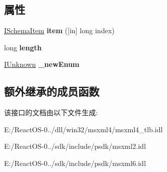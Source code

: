 \subsection*{属性}
\begin{DoxyCompactItemize}
\item 
\mbox{\label{interface_m_s_x_m_l2_1_1_i_schema_item_collection_a08dca69ffd3855a7cfbb4d5af7f3cdad}} 
\hyperlink{interface_m_s_x_m_l2_1_1_i_schema_item}{I\+Schema\+Item} {\bfseries item} (\mbox{[}in\mbox{]} long index)
\item 
\mbox{\label{interface_m_s_x_m_l2_1_1_i_schema_item_collection_a2a92a7230546ffbe60588e863faf9268}} 
long {\bfseries length}
\item 
\mbox{\label{interface_m_s_x_m_l2_1_1_i_schema_item_collection_afacec734d877c400d08137cb8339fdbe}} 
\hyperlink{interface_i_unknown}{I\+Unknown} {\bfseries \+\_\+new\+Enum}
\end{DoxyCompactItemize}
\subsection*{额外继承的成员函数}


该接口的文档由以下文件生成\+:\begin{DoxyCompactItemize}
\item 
E\+:/\+React\+O\+S-\/0../dll/win32/msxml4/msxml4\+\_\+tlb.\+idl\item 
E\+:/\+React\+O\+S-\/0../sdk/include/psdk/msxml2.\+idl\item 
E\+:/\+React\+O\+S-\/0../sdk/include/psdk/msxml6.\+idl\end{DoxyCompactItemize}
